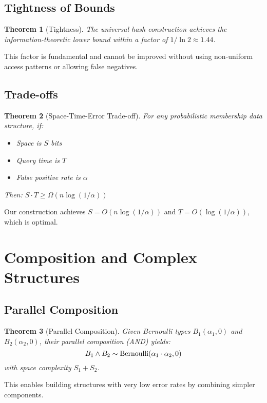 \documentclass[11pt]{article}
\newtheorem{theorem}{Theorem}
\begin{document}
\subsection{Tightness of Bounds}

\begin{theorem}[Tightness]
The universal hash construction achieves the information-theoretic lower bound within a factor of $1/\ln 2 \approx 1.44$.
\end{theorem}

This factor is fundamental and cannot be improved without using non-uniform access patterns or allowing false negatives.

\subsection{Trade-offs}

\begin{theorem}[Space-Time-Error Trade-off]
For any probabilistic membership data structure, if:
\begin{itemize}
\item Space is $S$ bits
\item Query time is $T$
\item False positive rate is $\alpha$
\end{itemize}
Then: $S \cdot T \geq \Omega(n \log(1/\alpha))$
\end{theorem}

Our construction achieves $S = O(n \log(1/\alpha))$ and $T = O(\log(1/\alpha))$, which is optimal.

\section{Composition and Complex Structures}

\subsection{Parallel Composition}

\begin{theorem}[Parallel Composition]
Given Bernoulli types $B_1(\alpha_1, 0)$ and $B_2(\alpha_2, 0)$, their parallel composition (AND) yields:
$$B_1 \wedge B_2 \sim \text{Bernoulli}(\alpha_1 \cdot \alpha_2, 0)$$
with space complexity $S_1 + S_2$.
\end{theorem}

This enables building structures with very low error rates by combining simpler components.
\end{document}
